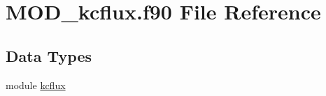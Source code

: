 \hypertarget{MOD__kcflux_8f90}{\section{M\-O\-D\-\_\-kcflux.\-f90 File Reference}
\label{MOD__kcflux_8f90}
}
\subsection*{Data Types}
\begin{DoxyCompactItemize}
\item 
module \hyperlink{classkcflux}{kcflux}
\end{DoxyCompactItemize}

